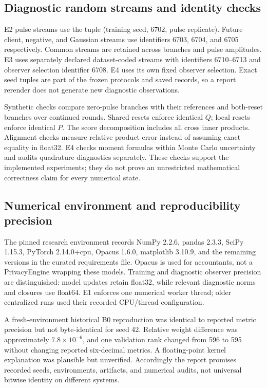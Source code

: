 \subsection{Diagnostic random streams and identity checks}
E2 pulse streams use the tuple (training seed, 6702, pulse replicate).
Future client, negative, and Gaussian streams use identifiers 6703, 6704,
and 6705 respectively. Common streams are retained across branches and
pulse amplitudes. E3 uses separately declared dataset-coded streams with
identifiers 6710--6713 and observer selection identifier 6708. E4 uses
its own fixed observer selection. Exact seed tuples are part of the
frozen protocols and saved records, so a report rerender does not generate
new diagnostic observations.

Synthetic checks compare zero-pulse branches with their references and
both-reset branches over continued rounds. Shared resets enforce identical
$Q$; local resets enforce identical $P$. The score decomposition includes
all cross inner products. Alignment checks measure relative product error
instead of assuming exact equality in float32. E4 checks moment formulas
within Monte Carlo uncertainty and audits quadrature diagnostics separately.
These checks support the implemented experiments; they do not prove an
unrestricted mathematical correctness claim for every numerical state.

\subsection{Numerical environment and reproducibility precision}
The pinned research environment records NumPy 2.2.6, pandas 2.3.3, SciPy
1.15.3, PyTorch 2.14.0+cpu, Opacus 1.6.0, matplotlib 3.10.9, and the
remaining versions in the curated requirements file. Opacus is used for
accountants, not a PrivacyEngine wrapping these models. Training and
diagnostic observer precision are distinguished: model updates retain
float32, while relevant diagnostic norms and closures use float64.
E1 enforces one numerical worker thread; older centralized runs used
their recorded CPU/thread configuration.

A fresh-environment historical B0 reproduction was identical to reported
metric precision but not byte-identical for seed 42. Relative weight
difference was approximately $7.8\times10^{-6}$, and one validation
rank changed from 596 to 595 without changing reported six-decimal
metrics. A floating-point kernel explanation was plausible but unverified.
Accordingly the report promises recorded seeds, environments, artifacts,
and numerical audits, not universal bitwise identity on different systems.


